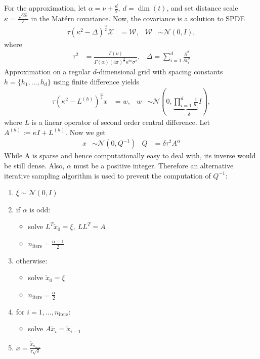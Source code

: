 \documentclass[times, a4paper, 12pt, onecolumn, oneside]{article}
\begin{document}
For the approximation, let $\alpha = \nu + \frac{d}{2}, ~ d = \dim(t)$, and set distance scale $\kappa = \frac{\sqrt{2\nu}}{\ell}$ in the Matérn covariance. Now, the covariance is a solution to SPDE
\[
\begin{aligned}
\tau(\kappa^2 - \Delta)^\frac{\alpha}{2}\mathcal{X} &= \mathcal{W}, & \mathcal{W} &\sim \mathcal{N}(0, I),
\end{aligned}
\]
where
\[
\begin{aligned}
\tau^2 &= \frac{\Gamma(\nu)}{\Gamma(\alpha)(4\pi)^\frac{d}{4}\kappa^{2\nu}\sigma^2}, &
\Delta = \sum_{i=1}^d \frac{\partial^2}{\partial t_i^2}
\end{aligned}
\]
Approximation on a regular $d$-dimensional grid with spacing constants $h=\{h_1, ..., h_d\}$ using finite difference yields
\[
\begin{aligned}
\tau(\kappa^2 - L^{(h)})^\frac{\alpha}{2}x &= w, & w &\sim \mathcal{N}(0, \underbrace{\prod_{i=1}^d \frac{1}{h_i}}_{=\delta} I),
\end{aligned}
\]
where $L$ is a linear operator of second order central difference. Let $A^{(h)}:= \kappa I + L^{(h)}$. Now we get
\[
\begin{aligned}
x &\sim \mathcal{N}(0, Q^{-1}) & Q &= \delta\tau^2 A^\alpha
\end{aligned}
\]
While A is sparse and hence computationally easy to deal with, its inverse would be still dense. Also, $\alpha$ must be a positive integer. Therefore an alternative iterative sampling algorithm is used to prevent the computation of $Q^{-1}$:
\begin{enumerate}
\item $\xi \sim \mathcal{N}(0, I)$
\item if $\alpha$ is odd:
\begin{itemize}
    \item solve $L^T\tilde{x}_0 = \xi, ~ LL^T = A$
    \item $n_\text{iters} = \frac{\alpha - 1}{2}$
\end{itemize}
\item otherwise:
\begin{itemize}
    \item solve $\tilde{x}_0 = \xi$
    \item $n_\text{iters} = \frac{\alpha}{2}$
\end{itemize}
\item for $i = 1,...,n_\text{iters}$:
\begin{itemize}
    \item solve $A\tilde{x}_{i} = \tilde{x}_{i-1}$
\end{itemize}
\item $x = \frac{\tilde{x}_{n_\text{iters}}} {\tau \sqrt{\delta}}$
\end{enumerate}
\end{document}

